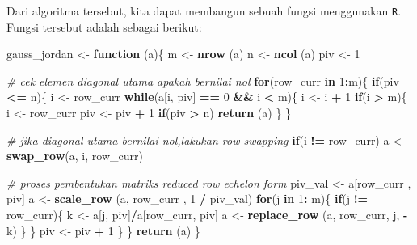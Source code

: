 \documentclass[]{book}
\newenvironment{Shaded}{\begin{snugshade}}{\end{snugshade}}
\newcommand{\CommentTok}[1]{\textcolor[rgb]{0.56,0.35,0.01}{\textit{#1}}}
\newcommand{\ControlFlowTok}[1]{\textcolor[rgb]{0.13,0.29,0.53}{\textbf{#1}}}
\newcommand{\DecValTok}[1]{\textcolor[rgb]{0.00,0.00,0.81}{#1}}
\newcommand{\KeywordTok}[1]{\textcolor[rgb]{0.13,0.29,0.53}{\textbf{#1}}}
\newcommand{\NormalTok}[1]{#1}
\newcommand{\OperatorTok}[1]{\textcolor[rgb]{0.81,0.36,0.00}{\textbf{#1}}}
\newcommand{\StringTok}[1]{\textcolor[rgb]{0.31,0.60,0.02}{#1}}
\theoremstyle{definition}
\theoremstyle{definition}
\theoremstyle{definition}
\theoremstyle{remark}
\begin{document}
Dari algoritma tersebut, kita dapat membangun sebuah fungsi menggunakan \texttt{R}. Fungsi tersebut adalah sebagai berikut:

\begin{Shaded}
\begin{Highlighting}[]
\NormalTok{gauss_jordan <-}\StringTok{ }\ControlFlowTok{function}\NormalTok{ (a)\{}
\NormalTok{    m <-}\StringTok{ }\KeywordTok{nrow}\NormalTok{ (a)}
\NormalTok{    n <-}\StringTok{ }\KeywordTok{ncol}\NormalTok{ (a)}
\NormalTok{    piv <-}\StringTok{ }\DecValTok{1}
    
\CommentTok{# cek elemen diagonal utama apakah bernilai nol}
    \ControlFlowTok{for}\NormalTok{(row_curr }\ControlFlowTok{in} \DecValTok{1}\OperatorTok{:}\NormalTok{m)\{}
        \ControlFlowTok{if}\NormalTok{(piv }\OperatorTok{<=}\StringTok{ }\NormalTok{n)\{}
\NormalTok{            i <-}\StringTok{ }\NormalTok{row_curr}
            \ControlFlowTok{while}\NormalTok{(a[i, piv] }\OperatorTok{==}\StringTok{ }\DecValTok{0} \OperatorTok{&&}\StringTok{ }\NormalTok{i }\OperatorTok{<}\StringTok{ }\NormalTok{m)\{}
\NormalTok{                i <-}\StringTok{ }\NormalTok{i }\OperatorTok{+}\StringTok{ }\DecValTok{1}
                \ControlFlowTok{if}\NormalTok{(i }\OperatorTok{>}\StringTok{ }\NormalTok{m)\{}
\NormalTok{                    i <-}\StringTok{ }\NormalTok{row_curr}
\NormalTok{                    piv <-}\StringTok{ }\NormalTok{piv }\OperatorTok{+}\StringTok{ }\DecValTok{1}
                    \ControlFlowTok{if}\NormalTok{(piv }\OperatorTok{>}\StringTok{ }\NormalTok{n)}
                        \KeywordTok{return}\NormalTok{ (a)}
\NormalTok{                \}}
\NormalTok{            \}}

\CommentTok{# jika diagonal utama bernilai nol,lakukan row swapping}
            \ControlFlowTok{if}\NormalTok{(i }\OperatorTok{!=}\StringTok{ }\NormalTok{row_curr)}
\NormalTok{                a <-}\StringTok{ }\KeywordTok{swap_row}\NormalTok{(a, i, row_curr)}
            
\CommentTok{# proses pembentukan matriks reduced row echelon form}
\NormalTok{            piv_val <-}\StringTok{ }\NormalTok{a[row_curr , piv]}
\NormalTok{            a <-}\StringTok{ }\KeywordTok{scale_row}\NormalTok{ (a, row_curr , }\DecValTok{1} \OperatorTok{/}\StringTok{ }\NormalTok{piv_val)}
            \ControlFlowTok{for}\NormalTok{(j }\ControlFlowTok{in} \DecValTok{1}\OperatorTok{:}\StringTok{ }\NormalTok{m)\{}
                \ControlFlowTok{if}\NormalTok{(j }\OperatorTok{!=}\StringTok{ }\NormalTok{row_curr)\{}
\NormalTok{                    k <-}\StringTok{ }\NormalTok{a[j, piv]}\OperatorTok{/}\NormalTok{a[row_curr, piv]}
\NormalTok{                    a <-}\StringTok{ }\KeywordTok{replace_row}\NormalTok{ (a, row_curr, j, }\OperatorTok{-}\NormalTok{k)}
\NormalTok{                \}}
\NormalTok{            \}}
\NormalTok{            piv <-}\StringTok{ }\NormalTok{piv }\OperatorTok{+}\StringTok{ }\DecValTok{1}
\NormalTok{        \}}
\NormalTok{    \}}
    \KeywordTok{return}\NormalTok{ (a)}
\NormalTok{\}}
\end{Highlighting}
\end{Shaded}
\end{document}
